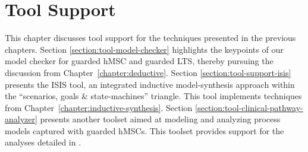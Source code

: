 \chapter{Tool Support\label{chapter:tool-support}}

This chapter discusses tool support for the techniques presented in the previous chapters. Section \ref{section:tool-model-checker} highlights the keypoints of our model checker for guarded hMSC and guarded LTS, thereby pursuing the discussion from Chapter~\ref{chapter:deductive}. Section \ref{section:tool-support-isis} presents the ISIS tool, an integrated inductive model-synthesis approach within the ``scenarios, goals $\&$ state-machines'' triangle. This tool implements techniques from Chapter~\ref{chapter:inductive-synthesis}. Section \ref{section:tool-clinical-pathway-analyzer} presents another toolset aimed at modeling and analyzing process models captured with guarded hMSCs. This toolset provides support for the analyses detailed in \cite{Damas:2011}.




